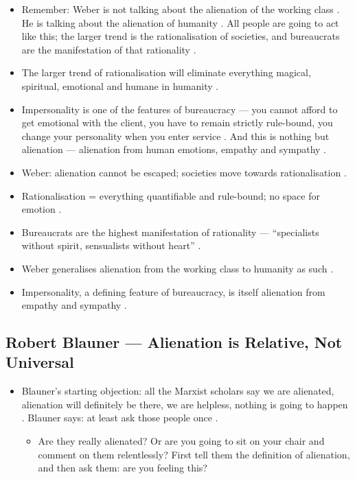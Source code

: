 \begin{itemize}
    \item Remember: Weber is not talking about the alienation of the working class . He is talking about the alienation of humanity . All people are going to act like this; the larger trend is the rationalisation of societies, and bureaucrats are the manifestation of that rationality .
    \item The larger trend of rationalisation will eliminate everything magical, spiritual, emotional and humane in humanity .
    \item Impersonality is one of the features of bureaucracy --- you cannot afford to get emotional with the client, you have to remain strictly rule-bound, you change your personality when you enter service . And this is nothing but alienation --- alienation from human emotions, empathy and sympathy .
\end{itemize}

\begin{QuickRevision}
\begin{itemize}
    \item Weber: alienation cannot be escaped; societies move towards rationalisation .
    \item Rationalisation = everything quantifiable and rule-bound; no space for emotion .
    \item Bureaucrats are the highest manifestation of rationality --- ``specialists without spirit, sensualists without heart'' .
    \item Weber generalises alienation from the working class to humanity as such .
    \item Impersonality, a defining feature of bureaucracy, is itself alienation from empathy and sympathy .
\end{itemize}
\end{QuickRevision}

\subsection{Robert Blauner --- Alienation is Relative, Not Universal}
\begin{itemize}
    \item Blauner's starting objection: all the Marxist scholars say we are alienated, alienation will definitely be there, we are helpless, nothing is going to happen . Blauner says: at least ask those people once .
    \begin{itemize}
        \item Are they really alienated? Or are you going to sit on your chair and comment on them relentlessly? First tell them the definition of alienation, and then ask them: are you feeling this? 
    \end{itemize}
\end{itemize}

